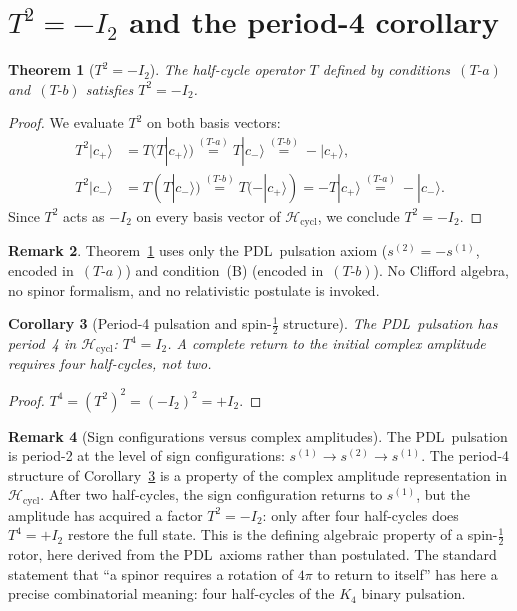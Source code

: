 \documentclass[11pt,a4paper]{article}
\newtheorem{theorem}{Theorem}[section]
\newtheorem{corollary}[theorem]{Corollary}
\theoremstyle{definition}
\newtheorem{remark}[theorem]{Remark}
\newcommand{\PDL}{\textnormal{PDL}}
\newcommand{\Hcycl}{\mathcal{H}_{\mathrm{cycl}}}
\newcommand{\cplu}{|c_+\rangle}
\newcommand{\cmin}{|c_-\rangle}
\newcommand{\Kfour}{K_4}
\begin{document}
\section{\texorpdfstring{$T^2 = -I_2$}{T2 = -I2} and the period-4 corollary}
\label{sec:T2}

\begin{theorem}[$T^2 = -I_2$]
\label{thm:T2}
The half-cycle operator $T$ defined by conditions~$(T\textrm{-}a)$ and~$(T\textrm{-}b)$ satisfies $T^2 = -I_2$.
\end{theorem}

\begin{proof}
We evaluate $T^2$ on both basis vectors:
\begin{align*}
T^2\cplu &= T(T\cplu) \stackrel{(T\text{-}a)}{=} T\cmin \stackrel{(T\text{-}b)}{=} -\cplu, \\
T^2\cmin &= T(T\cmin) \stackrel{(T\text{-}b)}{=} T(-\cplu) = -T\cplu \stackrel{(T\text{-}a)}{=} -\cmin.
\end{align*}
Since $T^2$ acts as $-I_2$ on every basis vector of $\Hcycl$, we conclude $T^2 = -I_2$.
\end{proof}

\begin{remark}
Theorem~\ref{thm:T2} uses only the \PDL\ pulsation axiom ($s^{(2)} = -s^{(1)}$, encoded in~$(T\textrm{-}a)$) and condition~(B) (encoded in~$(T\textrm{-}b)$). No Clifford algebra, no spinor formalism, and no relativistic postulate is invoked.
\end{remark}

\begin{corollary}[Period-4 pulsation and spin-$\tfrac{1}{2}$ structure]
\label{cor:period4}
The \PDL\ pulsation has period~4 in $\Hcycl$: $T^4 = I_2$. A complete return to the initial complex amplitude requires four half-cycles, not two.
\end{corollary}

\begin{proof}
$T^4 = (T^2)^2 = (-I_2)^2 = +I_2$.
\end{proof}

\begin{remark}[Sign configurations versus complex amplitudes]
\label{rem:period_distinction}
The \PDL\ pulsation is period-2 at the level of sign configurations: $s^{(1)} \to s^{(2)} \to s^{(1)}$. The period-4 structure of Corollary~\ref{cor:period4} is a property of the complex amplitude representation in $\Hcycl$. After two half-cycles, the sign configuration returns to $s^{(1)}$, but the amplitude has acquired a factor $T^2 = -I_2$: only after four half-cycles does $T^4 = +I_2$ restore the full state. This is the defining algebraic property of a spin-$\tfrac{1}{2}$ rotor, here derived from the \PDL\ axioms rather than postulated. The standard statement that ``a spinor requires a rotation of $4\pi$ to return to itself'' has here a precise combinatorial meaning: four half-cycles of the $\Kfour$ binary pulsation.
\end{remark}
\end{document}

